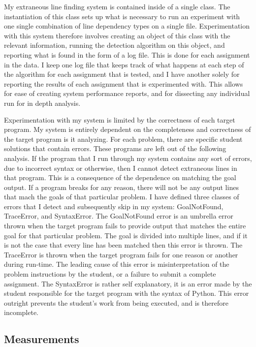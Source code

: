 \documentclass[draft]{article}
\begin{document}
My extraneous line finding system is contained inside of a single class. The instantiation of this class sets up what is necessary to run an experiment with one single combination of line dependency types on a single file. Experimentation with this system therefore involves creating an object of this class with the relevant information, running the detection algorithm on this object, and reporting what is found in the form of a log file. This is done for each assignment in the data. I keep one log file that keeps track of what happens at each step of the algorithm for each assignment that is tested, and I have another solely for reporting the results of each assignment that is experimented with. This allows for ease of creating system performance reports, and for dissecting any individual run for in depth analysis. 

Experimentation with my system is limited by the correctness of each target program. My system is entirely dependent on the completeness and correctness of the target program is it analyzing. For each problem, there are specific student solutions that contain errors. These programs are left out of the following analysis. If the program that I run through my system contains any sort of errors, due to incorrect syntax or otherwise, then I cannot detect extraneous lines in that program. This is a consequence of the dependence on matching the goal output. If a program breaks for any reason, there will not be any output lines that mach the goals of that particular problem. I have defined three classes of errors that I detect and subsequently skip in my system: GoalNotFound, TraceError, and SyntaxError. The GoalNotFound error is an umbrella error thrown when the target program fails to provide output that matches the entire goal for that particular problem. The goal is divided into multiple lines, and if it is not the case that every line has been matched then this error is thrown. The TraceError is thrown when the target program fails for one reason or another during run-time. The leading cause of this error is misinterpretation of the problem instructions by the student, or a failure to submit a complete assignment. The SyntaxError is rather self explanatory, it is an error made by the student responsible for the target program with the syntax of Python. This error outright prevents the student's work from being executed, and is therefore incomplete.

\subsection{Measurements}
\end{document}

